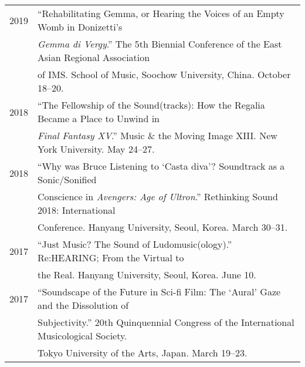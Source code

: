 \documentclass[letter,11pt,draft]{article}
\begin{document}
\begin{tabular}{p{2.5cm} p{12.5cm}}
    2019 & “Rehabilitating Gemma, or Hearing the Voices of an Empty Womb in
    Donizetti’s\\
    & \textit{Gemma di Vergy}.” The 5th Biennial Conference of the East Asian
    Regional Association\\
    & of IMS. School of Music, Soochow University, China. October 18–20.\\[2mm]
  
    
    2018 & ``The Fellowship of the Sound(tracks): How the Regalia Became a
    Place to Unwind in\\
    & \textit{Final Fantasy XV}.'' Music \& the Moving Image XIII. New York
    University. May 24--27.\\[2mm]
    
    2018 & “Why was Bruce Listening to ‘Casta diva’? Soundtrack as a Sonic/Sonified\\
    & Conscience in \textit{Avengers: Age of Ultron}.” Rethinking Sound 2018: International\\
    & Conference. Hanyang University, Seoul, Korea. March 30--31.\\[2mm]
  
    2017 & “Just Music? The Sound of Ludomusic(ology).” Re:HEARING; From the
    Virtual to\\
    & the Real. Hanyang University, Seoul, Korea. June 10.\\[2mm]
  
    2017 & “Soundscape of the Future in Sci-fi Film: The ‘Aural’ Gaze and the
    Dissolution of\\
    & Subjectivity.” 20th Quinquennial Congress of the International
    Musicological Society.\\
    & Tokyo University of the Arts, Japan. March 19--23.\\[2mm]
  

  \end{tabular}
  
\end{document}
